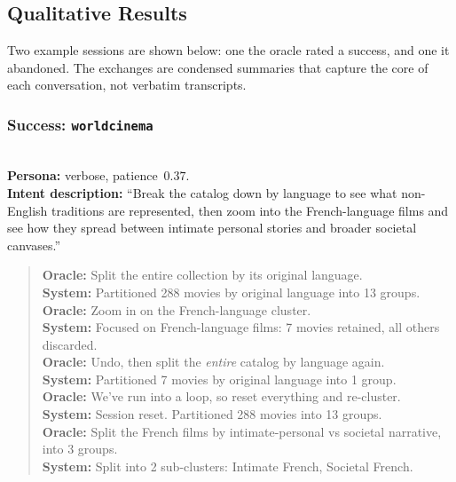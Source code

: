 \begin{table}[H]
  \centering
  \caption{How sessions ended, by condition.}
  \label{tab:termination}
\end{table}

\subsection{Qualitative Results}

Two example sessions are shown below: one the oracle rated a success, and one it abandoned. The
exchanges are condensed summaries that capture the core of each conversation, not verbatim
transcripts.

\subsubsection{\textbf{Success}: \texttt{worldcinema}}
\textbf{\\Persona:} verbose, patience~$0.37$.
\\
\textbf{Intent description:} ``Break the catalog down by language to see what non-English
traditions are represented, then zoom into the French-language films and see how they spread between
intimate personal stories and broader societal canvases.''
\\
\begin{quote}\small
\textbf{Oracle:} Split the entire collection by its original language.\\
\textbf{System:} Partitioned 288 movies by original language into 13 groups.\\
\textbf{Oracle:} Zoom in on the French-language cluster.\\
\textbf{System:} Focused on French-language films: 7 movies retained, all others discarded.\\
\textbf{Oracle:} Undo, then split the \emph{entire} catalog by language again.\\
\textbf{System:} Partitioned 7 movies by original language into 1 group.\\
\textbf{Oracle:} We've run into a loop, so reset everything and re-cluster.\\
\textbf{System:} Session reset. Partitioned 288 movies into 13 groups.\\
\textbf{Oracle:} Split the French films by intimate-personal vs societal narrative, into 3 groups.\\
\textbf{System:} Split into 2 sub-clusters: \textsf{Intimate French}, \textsf{Societal French}.
\end{quote}

